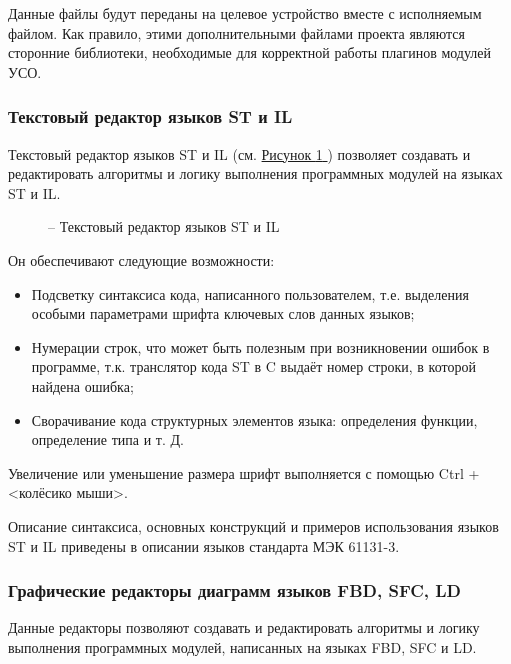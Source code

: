\documentclass[letterpaper,10pt,russian]{sphinxmanual}
\begin{document}
Данные файлы будут переданы на целевое устройство вместе с исполняемым
файлом. Как правило, этими дополнительными файлами проекта являются
сторонние библиотеки, необходимые для корректной работы плагинов модулей
УСО.


\subsubsection{Текстовый редактор языков ST и IL}
\label{usage_guide/ide_components:st-il}
Текстовый редактор языков ST и IL (см. \hyperref[usage_guide/ide_components:image52]{Рисунок \ref{usage_guide/ide_components:image52} }) позволяет создавать и
редактировать алгоритмы и логику выполнения программных модулей на
языках ST и IL.
\begin{figure}[htbp]
\centering
\capstart

\noindent{}
\caption{– Текстовый редактор языков ST и IL}\label{usage_guide/ide_components:image52}\end{figure}

Он обеспечивают следующие возможности:
\begin{itemize}
\item {} 
Подсветку синтаксиса кода, написанного пользователем, т.е. выделения
особыми параметрами шрифта ключевых слов данных языков;

\item {} 
Нумерации строк, что может быть полезным при возникновении ошибок в
программе, т.к. транслятор кода ST в C выдаёт номер строки, в которой
найдена ошибка;

\item {} 
Сворачивание кода структурных элементов языка: определения функции,
определение типа и т. Д.

\end{itemize}

Увеличение или уменьшение размера шрифт выполняется с помощью Ctrl +
\textless{}колёсико мыши\textgreater{}.

Описание синтаксиса, основных конструкций и примеров использования языков
ST и IL приведены в описании языков стандарта МЭК 61131-3.


\subsubsection{Графические редакторы диаграмм языков FBD, SFC, LD}
\label{usage_guide/ide_components:fbd-sfc-ld}
Данные редакторы позволяют создавать и редактировать алгоритмы и логику
выполнения программных модулей, написанных на языках FBD, SFC и LD.
\end{document}
